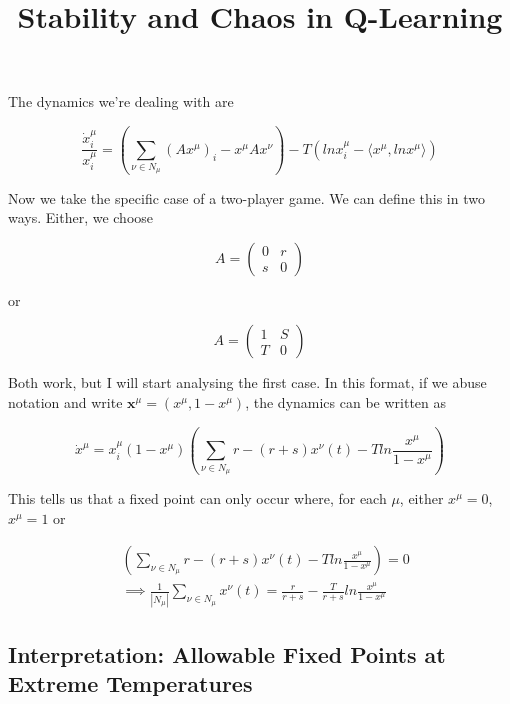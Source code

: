 \documentclass[preprint,12pt]{article}
\title{Stability and Chaos in Q-Learning}
\theoremstyle{definition}
\theoremstyle{theorem}
\theoremstyle{remark}
\theoremstyle{example}
\newcommand{\x}{\mathbf{x}}
\newcommand{\xmu}{x^\mu}
\newcommand{\xnu}{x^\nu}
\begin{document}
	
	\maketitle
	
	The dynamics we're dealing with are
	
	\begin{equation}
		\frac{\dot{x}^\mu_i}{x^\mu_i} = \left( \sum_{\nu \in N_\mu} (A \xmu)_i - \xmu A \xnu \right) - T (ln \xmu_i - \langle \xmu, ln \xmu \rangle)
	\end{equation}
	
	Now we take the specific case of a two-player game. We can define this in two ways. Either, we choose
	
	\begin{equation}
		A = \begin{pmatrix}
			0 & r \\ s & 0
		\end{pmatrix}
	\end{equation}

	or
	
	\begin{equation}
		A = \begin{pmatrix}
			1 & S \\ T & 0
		\end{pmatrix}
	\end{equation}
	
	Both work, but I will start analysing the first case. In this format, if we abuse notation and write $\x^\mu = (\xmu, 1 - \xmu)$, the dynamics can be written as
	
	\begin{equation}
		\dot{x}^\mu = x^\mu_i (1 - x^\mu) \left( \sum_{\nu \in N_\mu} r - (r + s) \xnu(t)  - T ln \frac{x^\mu}{1 - x^\mu} \right)
	\end{equation}
	
	This tells us that a fixed point can only occur where, for each $\mu$, either $\xmu = 0$, $\xmu = 1$ or
	
	\begin{align} \label{eq::fixedpointcondition}
		& \left( \sum_{\nu \in N_\mu} r - (r + s) \xnu(t)  - T ln \frac{x^\mu}{1 - x^\mu} \right) = 0 \nonumber \\
		& \implies \frac{1}{|N_\mu|} \sum_{\nu \in N_\mu} x^\nu(t) = \frac{r}{r + s} - \frac{T}{r + s} ln \frac{x^\mu}{1 - x^\mu} 
	\end{align}
	
	\subsection*{Interpretation: Allowable Fixed Points at Extreme Temperatures}
	
\end{document}
